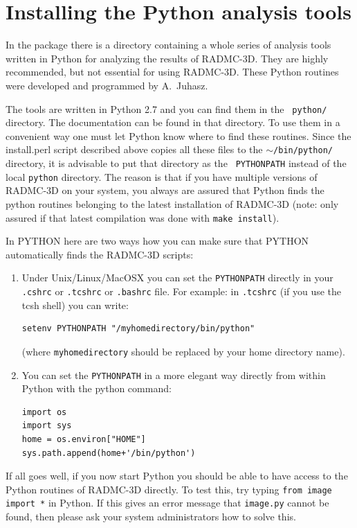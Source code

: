 \documentclass{report}
\begin{document}
\section{Installing the Python analysis tools}
\label{sec-install-pythonscripts}
In the package there is a directory containing a whole series of analysis
tools written in Python for analyzing the results of RADMC-3D. They are
highly recommended, but not essential for using RADMC-3D. These
Python routines were developed and programmed by A.~Juhasz. 

The tools are written in Python 2.7 and you can find them in the {\small\tt
  python/} directory. The documentation can be found in that directory.
To use them in a convenient way one must let Python
know where to find these routines. Since the install.perl script described
above copies all these files to the $\sim${\small\tt /bin/python/}
directory, it is advisable to put that directory as the {\small\tt
  PYTHONPATH} instead of the local {\small\tt python} directory.  The reason
is that if you have multiple versions of RADMC-3D on your system, you always
are assured that Python finds the python routines belonging to the latest
installation of RADMC-3D (note: only assured if that latest compilation was
done with {\small\tt make install}).

In PYTHON here are two ways how you can make sure that PYTHON automatically
finds the RADMC-3D scripts:
\begin{enumerate}
\item Under Unix/Linux/MacOSX you can set the {\small\tt PYTHONPATH} directly in your
  {\small\tt .cshrc} or {\small\tt .tcshrc} or {\small\tt .bashrc} file. For example: in
  {\small\tt .tcshrc} (if you use the tcsh shell) you can write:
{\small\begin{verbatim}
setenv PYTHONPATH "/myhomedirectory/bin/python"
\end{verbatim}}
(where {\small\tt myhomedirectory} should be replaced by your home directory name). 
\item You can set the {\small\tt PYTHONPATH} in a more elegant way directly from within
Python with the python command:
{\small\begin{verbatim}
import os
import sys
home = os.environ["HOME"]
sys.path.append(home+'/bin/python')
\end{verbatim}}
\end{enumerate}
If all goes well, if you now start Python you should be able to have access
to the Python routines of RADMC-3D directly. To test this, try typing
{\small\tt from image import *} in Python. If this gives an error message
that {\small\tt image.py} cannot be found, then please ask your system
administrators how to solve this.
\end{document}
